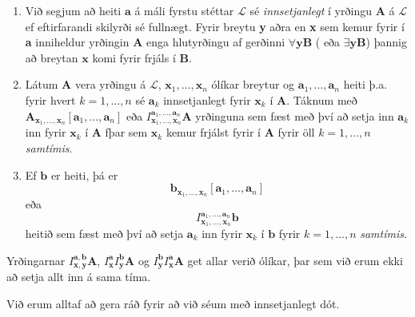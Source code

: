 \documentclass[12pt]{book}
\begin{document}
\begin{skgr}
  \begin{enumerate}[(1)]
  \item Við segjum að heiti $\mathbf{a}$ á máli fyrstu stéttar
    $\mathcal{L}$ sé \emph{innsetjanlegt} í yrðingu \textbf{A} á
    $\mathcal{L}$ ef eftirfarandi skilyrði sé fullnægt. Fyrir breytu
    \textbf{y} aðra en \textbf{x} sem kemur fyrir í \textbf{a}
    inniheldur yrðingin \textbf{A} enga hlutyrðingu af gerðinni
    $\forall \mathbf{y} \mathbf{B}$ ( eða $\exists \mathbf{y}
    \mathbf{B}$) þannig að breytan $\mathbf{x}$ komi fyrir frjáls í
      $\mathbf{B}$.
    \item Látum \textbf{A} vera yrðingu á $\mathcal{L}$,
      $\mathbf{x}_1, \dotsc, \mathbf{x}_n$ ólíkar breytur og
      $\mathbf{a}_1, \dotsc, \mathbf{a}_n$ heiti þ.a. fyrir
      hvert $k = 1, \dotsc, n$ sé $\mathbf{a}_k$ innsetjanlegt
      fyrir $\mathbf{x}_k$ í $\mathbf{A}$.
      Táknum með $\mathbf{A}_{\mathbf{x}_1, \dotsc, \mathbf{x}_n}[\mathbf{a}_1, \dotsc, \mathbf{a}_n]$
      eða $I^{\mathbf{a}_1, \dotsc, \mathbf{a}_n}_{\mathbf{x}_1, \dotsc, \mathbf{x}_n} \mathbf{A}$
      yrðinguna sem fæst með því að setja inn $\mathbf{a}_k$ inn fyrir $\mathbf{x}_k$ í
      $\mathbf{A}$ fþar sem $\mathbf{x}_k$ kemur frjálst fyrir í $\mathbf{A}$ fyrir
      öll $k = 1, \dotsc, n$ \emph{samtímis}.

    \item Ef $\mathbf{b}$ er heiti, þá er
      \[ \mathbf{b}_{\mathbf{x}_1, \dotsc, \mathbf{x}_n} [ \mathbf{a}_1, \dotsc, \mathbf{a}_n] \]
      eða
      \[I^{\mathbf{a}_1, \dotsc, \mathbf{a}_n}_{\mathbf{x}_1, \dotsc, \mathbf{x}_n} \mathbf{b}\]
      heitið sem fæst með því að setja $\mathbf{a}_k$ inn fyrir $\mathbf{x}_k$ í $\mathbf{b}$
      fyrir $k= 1, \dotsc, n$ \emph{samtímis}.
    \end{enumerate}
\end{skgr}

\begin{ath}
  Yrðingarnar $I^{\mathbf{a}, \mathbf{b}}_{\mathbf{x}, \mathbf{y}} \mathbf{A}$,
  $I^{\mathbf{a}}_{\mathbf{x}} I^{\mathbf{b}}_{\mathbf{y}} \mathbf{A}$ og
  $I^{\mathbf{b}}_{\mathbf{y}} I^{\mathbf{a}}_{\mathbf{x}} \mathbf{A}$
  get allar verið ólíkar, þar sem við erum ekki að setja allt inn á sama tíma.
\end{ath}

Við erum alltaf að gera ráð fyrir að við séum með innsetjanlegt dót.
\end{document}
